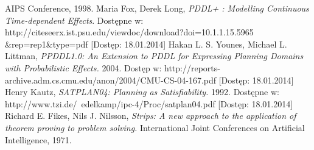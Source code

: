 \begin{thebibliography}{1}
AIPS Conference, 1998.
 Maria Fox, Derek Long, \emph{PDDL+ : Modelling Continuous Time-dependent Effects}. Dostępne w: http://citeseerx.ist.psu.edu/viewdoc/download?doi=10.1.1.15.5965 \&{}rep=rep1\&{}type=pdf [Dostęp: 18.01.2014]
 Hakan L. S. Younes, Michael L. Littman, \emph{PPDDL1.0: An Extension to PDDL for Expressing
Planning Domains with Probabilistic Effects.} 2004. Dostęp w: http://reports-archive.adm.cs.cmu.edu/anon/2004/CMU-CS-04-167.pdf [Dostęp: 18.01.2014]
 Henry Kautz, \emph{SATPLAN04: Planning as Satisfiability.} 1992. Dostępne w:
http://www.tzi.de/~edelkamp/ipc-4/Proc/satplan04.pdf [Dostęp: 18.01.2014]
 Richard E. Fikes, Nils J. Nilsson, \emph{Strips: A new approach to the application of theorem proving to problem solving.} International Joint Conferences on Artificial Intelligence, 1971.







\end{thebibliography}

